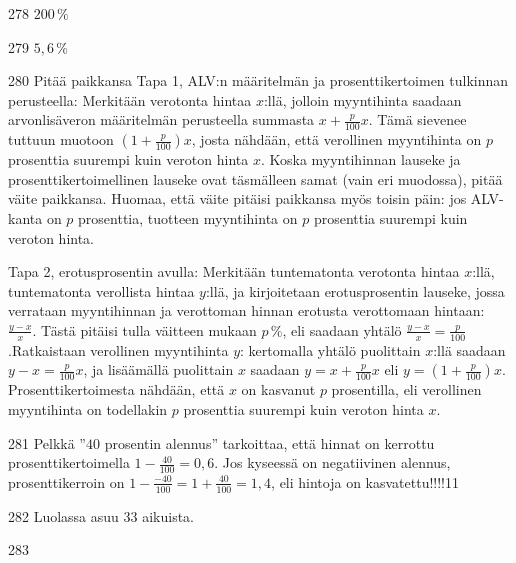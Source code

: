 \begin{Vastaus}{278}
        $200\,\%$
    
\end{Vastaus}
\begin{Vastaus}{279}
        $5,6\,\%$
    
\end{Vastaus}
\begin{Vastaus}{280}
	Pitää paikkansa
	 Tapa 1, ALV:n määritelmän ja prosenttikertoimen tulkinnan perusteella: Merkitään verotonta hintaa $x$:llä, jolloin myyntihinta saadaan arvonlisäveron määritelmän perusteella summasta $x+\frac{p}{100}x$. Tämä sievenee tuttuun muotoon $(1+\frac{p}{100})x$, josta nähdään, että verollinen myyntihinta on $p$ prosenttia suurempi kuin veroton hinta $x$. Koska myyntihinnan lauseke ja prosenttikertoimellinen lauseke ovat täsmälleen samat (vain eri muodossa), pitää väite paikkansa. Huomaa, että väite pitäisi paikkansa myös toisin päin: jos ALV-kanta on $p$ prosenttia, tuotteen myyntihinta on $p$ prosenttia suurempi kuin veroton hinta.

	Tapa 2, erotusprosentin avulla: Merkitään tuntematonta verotonta hintaa $x$:llä, tuntematonta verollista hintaa $y$:llä, ja kirjoitetaan erotusprosentin lauseke, jossa verrataan myyntihinnan ja verottoman hinnan erotusta verottomaan hintaan: $\frac{y-x}{x}$. Tästä pitäisi tulla väitteen mukaan $p$\,\%, eli saadaan yhtälö $\frac{y-x}{x}=\frac{p}{100}$.Ratkaistaan verollinen myyntihinta $y$: kertomalla yhtälö puolittain $x$:llä saadaan $y-x=\frac{p}{100}x$, ja lisäämällä puolittain $x$ saadaan $y=x+\frac{p}{100}x$ eli $y=(1+\frac{p}{100})x$. Prosenttikertoimesta nähdään, että $x$ on kasvanut $p$ prosentilla, eli verollinen myyntihinta on todellakin $p$ prosenttia suurempi kuin veroton hinta $x$.
	
\end{Vastaus}
\begin{Vastaus}{281}
	Pelkkä ''$40$ prosentin alennus'' tarkoittaa, että hinnat on kerrottu prosenttikertoimella $1-\frac{40}{100}=0,6$. Jos kyseessä on negatiivinen alennus, prosenttikerroin on $1-\frac{-40}{100}=1+\frac{40}{100}=1,4$, eli hintoja on kasvatettu!!!!11
	
\end{Vastaus}
\begin{Vastaus}{282}
	Luolassa asuu $33$ aikuista.
	
\end{Vastaus}
\begin{Vastaus}{283}
	
\end{Vastaus}
